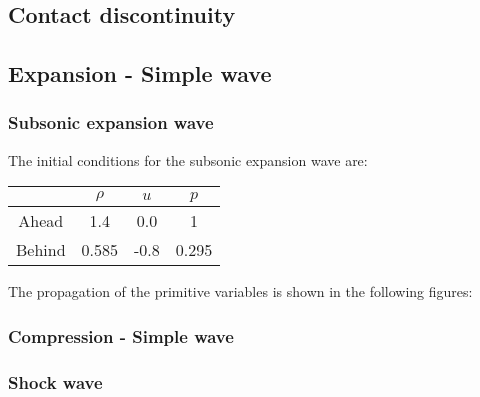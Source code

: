 \documentclass{report}
\begin{document}
\subsection*{Contact discontinuity}
\subsection*{Expansion - Simple wave}
\subsubsection{Subsonic expansion wave}
The initial conditions for the subsonic expansion wave are:\\
\begin{table*}[h]
    \centering
    \begin{tabular}{|c|c|c|c|}
        \hline
        & $\rho$ & $u$ & $p$ \\
        \hline
        Ahead & 1.4 & 0.0 & 1 \\
        Behind & 0.585 & -0.8 & 0.295 \\ 
        \hline
    \end{tabular}
\end{table*}
The propagation of the primitive variables is shown in the following figures:

\subsubsection*{Compression - Simple wave}
\subsubsection*{Shock wave}
\end{document}
